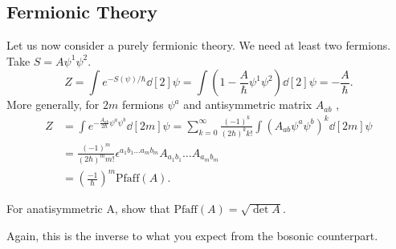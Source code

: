 \subsection{Fermionic Theory}%
\label{sub:fermionic_theory}

Let us now consider a purely fermionic theory. We need at least two fermions.
Take $S = A \psi^1 \psi^2$.
\begin{equation}
  Z = \int e^{-S (\psi) / \hbar} \dd[2]{\psi} = \int \left( 1 - \frac{A}{\hbar} \psi^1 \psi^2 \right) \dd[2]{\psi} = - \frac{A}{\hbar}.
\end{equation}
More generally, for $2m$  fermions $\psi^{a}$  and antisymmetric matrix $A_{ab}$ ,
\begin{align}
  Z &= \int e^{-\frac{A_{ab}}{2 \hbar} \psi^a \psi^{b}} \dd[2m]{\psi} = \sum_{k = 0}^{\infty} \frac{(-1)^k}{(2 \hbar)^k k!} \int (A_{ab} \psi^{a} \psi^{b})^k \dd[2m]{\psi}  \\
    &= \frac{(-1)^m}{(2 \hbar)^{m} m!} \epsilon^{a_1 b_1 \dots a_m b_m} A_{a_1 b_1 } \dots A_{a_m b_m} \\
    &= \left( \frac{-1}{\hbar} \right)^m \text{Pfaff}(A).
\end{align}
\begin{exercise}
  For anatisymmetric A, show that $\text{Pfaff}(A) = \sqrt{\det A}$.
\end{exercise}
\begin{leftbar}
  \begin{remark}
    Again, this is the inverse to what you expect from the bosonic counterpart.
  \end{remark}
\end{leftbar}
